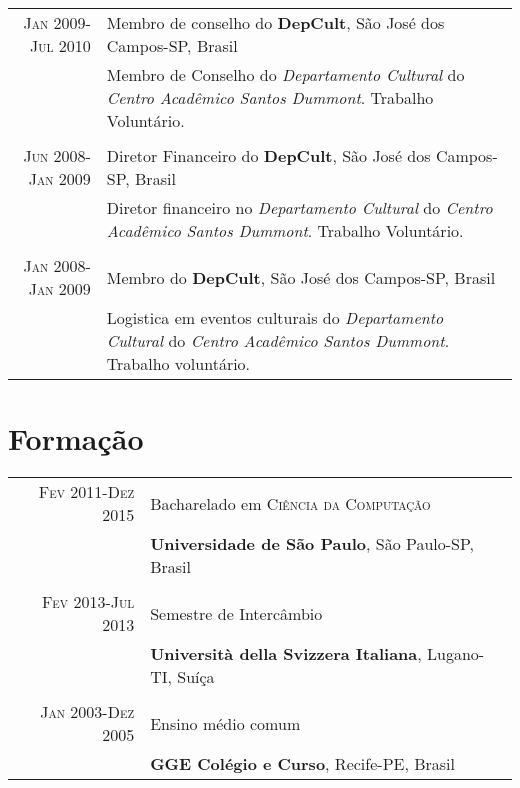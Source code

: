 \documentclass[a4paper,10pt]{article} %
\begin{document}
\begin{tabular}{r|p{11cm}}

\textsc{Jan 2009-Jul 2010} & Membro de conselho do \textbf{DepCult}, São José dos Campos-SP, Brasil \emph{}\\
& \footnotesize{Membro de Conselho do \textit{Departamento Cultural} do 
       \emph{Centro Acadêmico Santos Dummont}. Trabalho Voluntário.}\\
	\multicolumn{2}{c}{} \\



\textsc{Jun 2008-Jan 2009} & Diretor Financeiro do \textbf{DepCult}, São José dos Campos-SP, Brasil \emph{}\\
& \footnotesize{Diretor financeiro no \emph{Departamento Cultural} do 
       \emph{Centro Acadêmico Santos Dummont}. Trabalho Voluntário.}\\
\multicolumn{2}{c}{} \\



\textsc{Jan 2008-Jan 2009} & Membro do \textbf{DepCult}, São José dos Campos-SP, Brasil \emph{}\\
& \footnotesize{Logistica em eventos culturais do \emph{Departamento Cultural} do \emph{Centro Acadêmico Santos Dummont}. Trabalho voluntário.}\\

\end{tabular}



\section{Formação}

\begin{tabular}{r|p{11cm}}
\textsc{Fev} 2011-\textsc{Dez} 2015& Bacharelado em \textsc{}\textsc{Ciência da Computação} \\& \normalsize\textbf{Universidade de São Paulo}, São Paulo-SP, Brasil\\
\multicolumn{2}{c}{}\\


\textsc{Fev} 2013-\textsc{Jul} 2013 & Semestre de Intercâmbio\\& \textbf{Università della Svizzera Italiana}, Lugano-TI, Suíça\\
\multicolumn{2}{c}{} \\
    

\textsc{Jan} 2003-\textsc{Dez} 2005& Ensino médio comum\\&\textbf{GGE Colégio e Curso}, Recife-PE, Brasil\\
\end{tabular}
\end{document}
